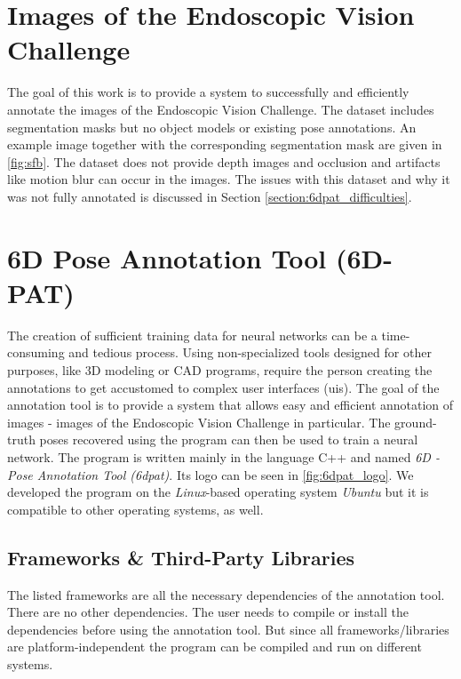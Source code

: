 \section{Images of the Endoscopic Vision Challenge}

The goal of this work is to provide a system to successfully and efficiently annotate the images of the Endoscopic Vision Challenge. The dataset includes segmentation masks but no object models or existing pose annotations. An example image together with the corresponding segmentation mask are given in \fig \ref{fig:sfb}. The dataset does not provide depth images and occlusion and artifacts like motion blur can occur in the images. The issues with this dataset and why it was not fully annotated is discussed in Section \ref{section:6dpat_difficulties}. 

\section{6D Pose Annotation Tool (6D-PAT)}

The creation of sufficient training data for neural networks can be a time-consuming and tedious process. Using non-specialized tools designed for other purposes, like 3D modeling or CAD programs, require the person creating the annotations to get accustomed to complex user interfaces (\gls{ui}s). The goal of the annotation tool is to provide a system that allows easy and efficient annotation of images - images of the Endoscopic Vision Challenge in particular. The ground-truth poses recovered using the program can then be used to train a neural network. The program is written mainly in the language C++ and named \textit{6D - Pose Annotation Tool (\gls{6dpat})}. Its logo can be seen in \fig \ref{fig:6dpat_logo}. We developed the program on the \textit{Linux}-based operating system \textit{Ubuntu} but it is compatible to other operating systems, as well.

\subsection{Frameworks \& Third-Party Libraries}

The listed frameworks are all the necessary dependencies of the annotation tool. There are no other dependencies. The user needs to compile or install the dependencies before using the annotation tool. But since all frameworks/libraries are platform-independent the program can be compiled and run on different systems. \\

